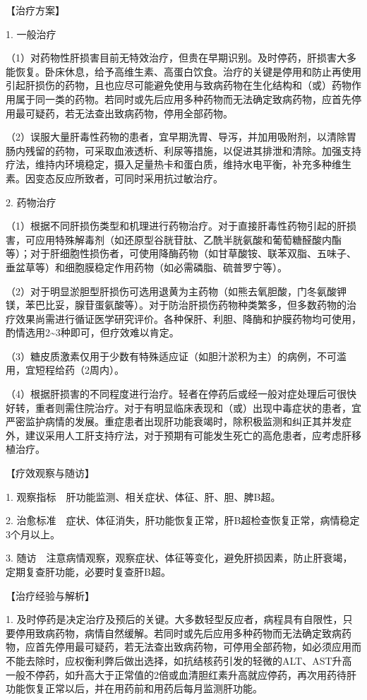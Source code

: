 【治疗方案】

1. 一般治疗

（1）对药物性肝损害目前无特效治疗，但贵在早期识别。及时停药，肝损害大多能恢复。卧床休息，给予高维生素、高蛋白饮食。治疗的关键是停用和防止再使用引起肝损伤的药物，且也应尽可能避免使用与致病药物在生化结构和（或）药物作用属于同一类的药物。若同时或先后应用多种药物而无法确定致病药物，应首先停用最可疑药，若无法查出致病药物，停用全部药物。

（2）误服大量肝毒性药物的患者，宜早期洗胃、导泻，并加用吸附剂，以清除胃肠内残留的药物，可采取血液透析、利尿等措施，以促进其排泄和清除。加强支持疗法，维持内环境稳定，摄入足量热卡和蛋白质，维持水电平衡，补充多种维生素。因变态反应所致者，可同时采用抗过敏治疗。

2. 药物治疗

（1）根据不同肝损伤类型和机理进行药物治疗。对于直接肝毒性药物引起的肝损害，可应用特殊解毒剂（如还原型谷胱苷肽、乙酰半胱氨酸和葡萄糖醛酸内酯等）；对于肝细胞性损伤者，可使用降酶药物（如甘草酸铵、联苯双脂、五味子、垂盆草等）和细胞膜稳定作用药物（如必需磷脂、硫普罗宁等）。

（2）对于明显淤胆型肝损伤可选用退黄为主药物（如熊去氧胆酸，门冬氨酸钾镁，苯巴比妥，腺苷蛋氨酸等）。对于防治肝损伤药物种类繁多，但多数药物的治疗效果尚需进行循证医学研究评价。各种保肝、利胆、降酶和护膜药物均可使用，酌情选用2\textasciitilde{}3种即可，但疗效难以肯定。

（3）糖皮质激素仅用于少数有特殊适应证（如胆汁淤积为主）的病例，不可滥用，宜短程给药（2周内）。

（4）根据肝损害的不同程度进行治疗。轻者在停药后或经一般对症处理后可很快好转，重者则需住院治疗。对于有明显临床表现和（或）出现中毒症状的患者，宜严密监护病情的发展。重症患者出现肝功能衰竭时，除积极监测和纠正其并发症外，建议采用人工肝支持疗法，对于预期有可能发生死亡的高危患者，应考虑肝移植治疗。

【疗效观察与随访】

1. 观察指标　肝功能监测、相关症状、体征、肝、胆、脾B超。

2.
治愈标准　症状、体征消失，肝功能恢复正常，肝B超检查恢复正常，病情稳定3个月以上。

3.
随访　注意病情观察，观察症状、体征等变化，避免肝损因素，防止肝衰竭，定期复查肝功能，必要时复查肝B超。

【治疗经验与解析】

1.
及时停药是决定治疗及预后的关键。大多数轻型反应者，病程具有自限性，只要停用致病药物，病情自然缓解。若同时或先后应用多种药物而无法确定致病药物，应首先停用最可疑药，若无法查出致病药物，可停用全部药物，如必须应用而不能去除时，应权衡利弊后做出选择，如抗结核药引发的轻微的ALT、AST升高一般不停药，如升高大于正常值的2倍或血清胆红素升高就应停药，再次用药待肝功能恢复正常以后，并在用药前和用药后每月监测肝功能。

